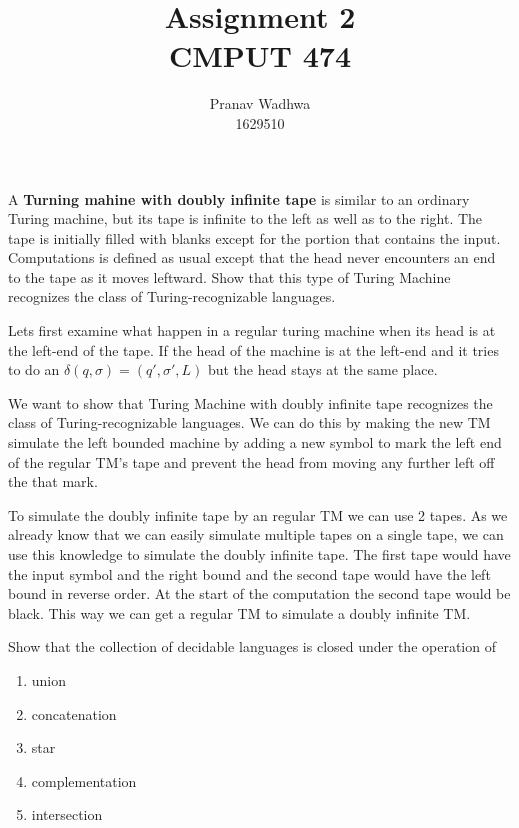 \documentclass[12pt]{exam}
\title{
  Assignment 2\\
  \large CMPUT 474
}
\author{Pranav Wadhwa\\1629510}
\begin{document}
\maketitle
\noindent


\begin{questions}

  \question{} %
  A \textbf{Turning mahine with doubly infinite tape} is similar to an ordinary Turing machine, but its tape is infinite to the left as well as to the right.
  The tape is initially filled with blanks except for the portion that contains the input.
  Computations is defined as usual except that the head never encounters an end to the tape as it moves leftward.
  Show that this type of Turing Machine recognizes the class of Turing-recognizable languages.

  \begin{solution}
    Lets first examine what happen in a regular turing machine when its head is at the left-end of the tape.
    If the head of the machine is at the left-end and it tries to do an $\delta(q,\sigma) = (q',\sigma ', L)$ but the head stays at the same place.

    We want to show that Turing Machine with doubly infinite tape recognizes the class of Turing-recognizable languages.
    We can do this by making the new TM simulate the left bounded machine by adding a new symbol to mark the left end of the regular TM's tape and prevent the head from moving any further left off the that mark.

    To simulate the doubly infinite tape by an regular TM we can use 2 tapes. As we already know that we can easily simulate multiple tapes on a single tape, we can use this knowledge to simulate the doubly infinite tape.
    The first tape would have the input symbol and the right bound and the second tape would have the left bound in reverse order. At the start of the computation the second tape would be black.
    This way we can get a regular TM to simulate a doubly infinite TM.
  \end{solution}

  \question{} %
  Show that the collection of decidable languages is closed under the operation of
  \begin{multicols}{2}
  \begin{enumerate}
    \item union
    \item concatenation
    \item star
    \item complementation
    \item intersection
  \end{enumerate}
  \end{multicols}


\end{questions}
\end{document}
